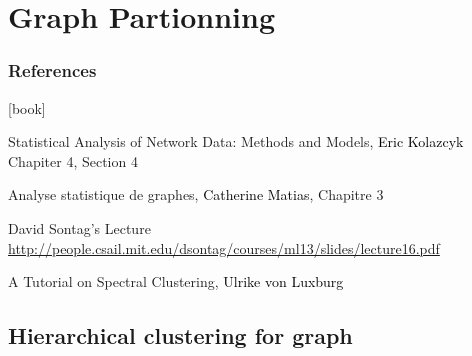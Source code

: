 \documentclass{beamer}\usepackage[]{graphicx}\usepackage[]{color}
\begin{document}
\section{Graph Partionning}

\begin{frame} 
  \frametitle{References}

    \begin{thebibliography}{99}
      [book]

     Statistical Analysis of Network Data: Methods and Models,
    \newblock \textcolor{black}{Eric Kolazcyk}
    \newblock \alert{Chapiter 4, Section 4}

     Analyse statistique de graphes, 
    \newblock \textcolor{black}{Catherine Matias}, \alert{Chapitre 3}

     David Sontag's Lecture
    \newblock \url{http://people.csail.mit.edu/dsontag/courses/ml13/slides/lecture16.pdf}
    
     A Tutorial on Spectral Clustering, 
    \newblock \textcolor{black}{Ulrike von Luxburg}

    \end{thebibliography}

\end{frame}

\subsection{Hierarchical clustering for graph}
\end{document}
